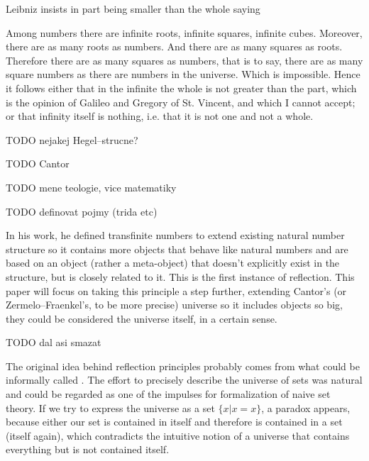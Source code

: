 \documentclass[12pt,a4paper]{article}
\begin{document}
Leibniz insists in part being smaller than the whole saying
\begin{displayquote}
Among numbers there are infinite roots, infinite squares, infinite cubes. Moreover, there are
as many roots as numbers. And there are as many squares as roots. Therefore there are as
many squares as numbers, that is to say, there are as many square numbers as there are
numbers in the universe. Which is impossible. Hence it follows either that in the infinite the
whole is not greater than the part, which is the opinion of Galileo and Gregory of St.
Vincent, and which I cannot accept; or that infinity itself is nothing, i.e. that it is not one and
not a whole. %
\end{displayquote}

TODO  nejakej Hegel--strucne?

TODO Cantor

TODO mene teologie, vice matematiky

TODO definovat pojmy (trida etc)


In his work, he defined transfinite numbers to extend existing natural number %
structure so it contains more objects that behave like natural numbers and are based on an object (rather a meta-object) that doesn't explicitly exist in the structure, but is closely related to it. This is the first instance of reflection. 
This paper will focus on taking this principle a step further, extending Cantor's (or Zermelo–Fraenkel's, to be more precise) universe so it includes objects so big, they could be considered the universe itself, in a certain sense. %


TODO dal asi smazat


The original idea behind reflection principles probably comes from what could be informally called .
The effort to precisely describe the universe of sets was natural and could be regarded as one of the impulses for formalization of naive set theory.
If we try to express the universe as a set $\{x  |  x = x\}$, a paradox appears, because either our set is contained in itself and therefore is contained in a set (itself again), which contradicts the intuitive notion of a universe that contains everything but is not contained itself.
\end{document}
